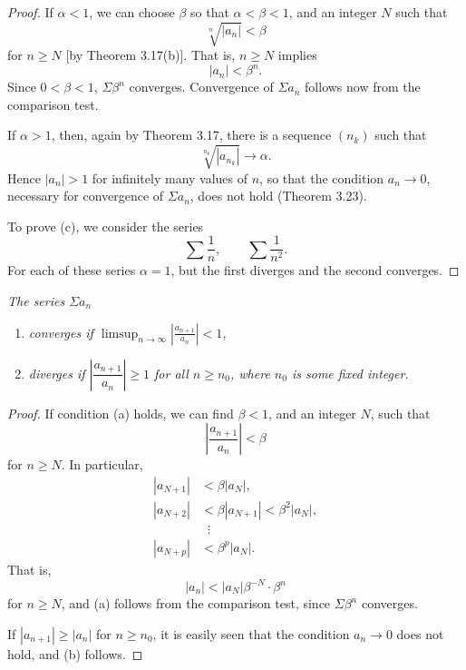 \begin{proof}
If $\alpha < 1$, we can choose $\beta$ so that $\alpha < \beta < 1$, and an
integer $N$ such that
\[ \sqrt[n]{|a_n|} < \beta \]
for $n \ge N$ [by Theorem 3.17(b)]. That is, $n \ge N$ implies
\[ |a_n| < \beta^n. \]
Since $0 < \beta < 1$, $\Sigma\beta^n$ converges. Convergence of $\Sigma a_n$
follows now from the comparison test.

If $\alpha > 1$, then, again by Theorem 3.17, there is a sequence $(n_k)$ such
that
\[ \sqrt[n_k]{|a_{n_k}|} \to \alpha. \]
Hence $|a_n| > 1$ for infinitely many values of $n$, so that the condition
$a_n \to 0$, necessary for convergence of $\Sigma a_n$, does not hold (Theorem
3.23).

To prove (c), we consider the series
\[ \sum \frac1n, \qquad \sum \frac{1}{n^2}. \]
For each of these series $\alpha = 1$, but the first diverges and the second
converges.
\end{proof}

\emph{The series $\Sigma a_n$}
\begin{enumerate}[label=(\alph*), leftmargin=2.2em, itemsep=1pt, topsep=3pt]
  \item \emph{converges if
        $\displaystyle\limsup_{n\to\infty}
        \left|\frac{a_{n+1}}{a_n}\right| < 1$,}
  \item \emph{diverges if $\left|\dfrac{a_{n+1}}{a_n}\right| \ge 1$ for all
        $n \ge n_0$, where $n_0$ is some fixed integer.}
\end{enumerate}

\begin{proof}
If condition (a) holds, we can find $\beta < 1$, and an integer $N$, such that
\[ \left|\frac{a_{n+1}}{a_n}\right| < \beta \]
for $n \ge N$. In particular,
\begin{align*}
  |a_{N+1}| &< \beta|a_N|,\\
  |a_{N+2}| &< \beta|a_{N+1}| < \beta^2|a_N|,\\
  &\;\;\vdots\\
  |a_{N+p}| &< \beta^p|a_N|.
\end{align*}
That is,
\[ |a_n| < |a_N|\beta^{-N}\cdot\beta^n \]
for $n \ge N$, and (a) follows from the comparison test, since $\Sigma\beta^n$
converges.

If $|a_{n+1}| \ge |a_n|$ for $n \ge n_0$, it is easily seen that the condition
$a_n \to 0$ does not hold, and (b) follows.
\end{proof}

